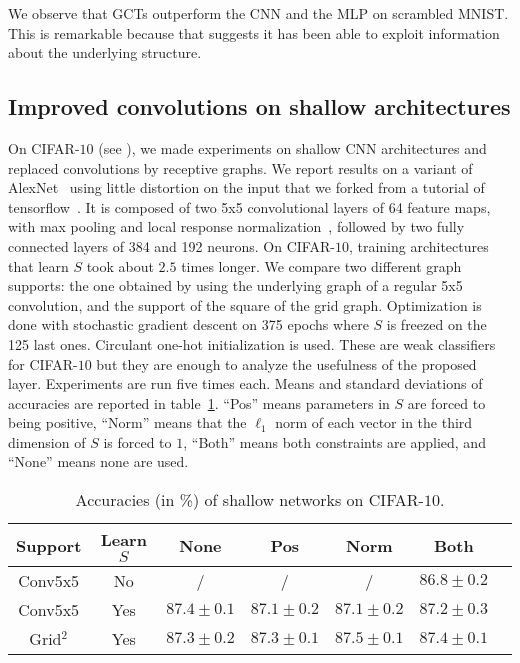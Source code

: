 We observe that GCTs outperform the CNN and the MLP on scrambled MNIST. This is remarkable because that suggests it has been able to exploit information about the underlying structure.

\subsection{Improved convolutions on shallow architectures}

On CIFAR-$10$ (see ), we made experiments on shallow CNN architectures and replaced convolutions by receptive graphs. We report results on a variant of AlexNet~\citep{krizhevsky2012imagenet} using little distortion on the input that we forked from a tutorial of tensorflow~\citep{tensorflow2015-whitepaper}.
It is composed of two 5x5 convolutional layers of 64 feature maps, with max pooling and local response normalization~\citep{krizhevsky2012imagenet}, followed by two fully connected layers of 384 and 192 neurons.
On CIFAR-$10$, training architectures that learn $S$ took about $2.5$ times longer.
We compare two different graph supports: the one obtained by using the underlying graph of a regular 5x5 convolution, and the support of the square of the grid graph. Optimization is done with stochastic gradient descent on 375 epochs where $S$ is freezed on the 125 last ones. Circulant one-hot initialization is used. These are weak classifiers for CIFAR-$10$ but they are enough to analyze the usefulness of the proposed layer.
Experiments are run five times each. Means and standard deviations of accuracies are reported in table~\ref{cifar}. ``Pos'' means parameters in $S$ are forced to being positive, ``Norm'' means that the $\ell_1$ norm of each vector in the third dimension of $S$ is forced to $1$, ``Both'' means both constraints are applied, and ``None'' means none are used.

\begin{table}[H]
  \caption{Accuracies (in \%) of shallow networks on CIFAR-$10$.}
  \begin{center}
    \bgroup
    \def\arraystretch{1.5}%
    \begin{tabular}{|c|c|c|c|c|c|c|}
      \hline
      Support & Learn $S$ & None & Pos & Norm & Both\\
      \hline
      \hline
      Conv5x5 & No & / & / & / & $86.8 \pm 0.2$\\
      \hline
      Conv5x5 & Yes & $87.4 \pm 0.1$ & $87.1 \pm 0.2$ & $87.1 \pm 0.2$ & $87.2 \pm 0.3$\\
      \hline
      Grid$^2$ & Yes & $87.3 \pm 0.2$ & $87.3 \pm 0.1$ & $87.5 \pm 0.1$ & $87.4 \pm 0.1$\\
      \hline
    \end{tabular}
    \egroup
  \end{center}
  \label{cifar}
\end{table}

